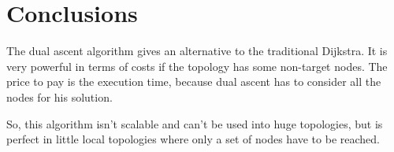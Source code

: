\chapter{Conclusions}\label{ch:conclusion}

The dual ascent algorithm gives an alternative to the traditional Dijkstra. It
is very powerful in terms of costs if the topology has some non-target nodes.
The price to pay is the execution time, because dual ascent has to consider all
the nodes for his solution. 

So, this algorithm isn't scalable and can't be used into huge topologies, but is
perfect in little local topologies where only a set of nodes have to be reached.
